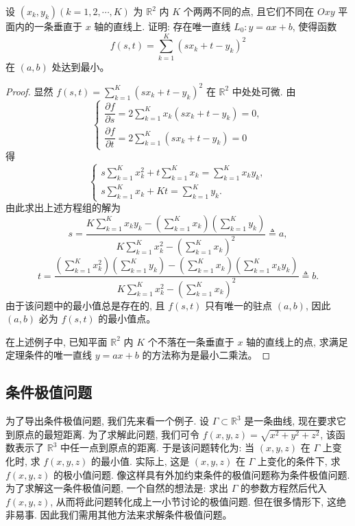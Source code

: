 \documentclass[UTF8,12pt,a4paper,fontset=fandol]{ctexart}
\begin{document}
\begin{example}\label{course-example-14-5-3}\quad 设 $(x_k,y_k)(k=1,2,\cdots,K)$ 为 $\mathbb R^2$ 内 $K$ 个两两不同的点, 且它们不同在 $Oxy$ 平面内的一条垂直于 $x$ 轴的直线上. 证明: 存在唯一直线 $L_0:y=ax+b$, 使得函数
\[
  f(s,t)=\sum_{k=1}^K(sx_k+t-y_k)^2
\]
在 $(a,b)$ 处达到最小。

\end{example}
\begin{proof}\quad 显然 $f(s,t)=\sum\limits_{k=1}^K(sx_k+t-y_k)^2$ 在 $\mathbb R^2$ 中处处可微. 由
\[
  \begin{cases}
    \dfrac{\partial f}{\partial s}
    =2\displaystyle\sum_{k=1}^K x_k(sx_k+t-y_k)=0,\\[1.2ex]
    \dfrac{\partial f}{\partial t}
    =2\displaystyle\sum_{k=1}^K (sx_k+t-y_k)=0
  \end{cases}
\]
得
\[
  \begin{cases}
    s\displaystyle\sum_{k=1}^K x_k^2
    +t\displaystyle\sum_{k=1}^K x_k
    =\displaystyle\sum_{k=1}^K x_ky_k,\\[1.2ex]
    s\displaystyle\sum_{k=1}^K x_k
    +Kt
    =\displaystyle\sum_{k=1}^K y_k.
  \end{cases}
\]
由此求出上述方程组的解为
\[
  s=
  \frac{
    K\displaystyle\sum_{k=1}^K x_ky_k
    -\left(\displaystyle\sum_{k=1}^K x_k\right)
     \left(\displaystyle\sum_{k=1}^K y_k\right)}
  {
    K\displaystyle\sum_{k=1}^K x_k^2
    -\left(\displaystyle\sum_{k=1}^K x_k\right)^2}
  \triangleq a,
\]
\[
  t=
  \frac{
    \left(\displaystyle\sum_{k=1}^K x_k^2\right)
    \left(\displaystyle\sum_{k=1}^K y_k\right)
    -\left(\displaystyle\sum_{k=1}^K x_k\right)
     \left(\displaystyle\sum_{k=1}^K x_ky_k\right)}
  {
    K\displaystyle\sum_{k=1}^K x_k^2
    -\left(\displaystyle\sum_{k=1}^K x_k\right)^2}
  \triangleq b.
\]
由于该问题中的最小值总是存在的, 且 $f(s,t)$ 只有唯一的驻点 $(a,b)$, 因此 $(a,b)$ 必为 $f(s,t)$ 的最小值点。

在上述例子中, 已知平面 $\mathbb R^2$ 内 $K$ 个不落在一条垂直于 $x$ 轴的直线上的点, 求满足定理条件的唯一直线 $y=ax+b$ 的方法称为是最小二乘法。

\end{proof}
\subsection{条件极值问题}

为了导出条件极值问题, 我们先来看一个例子. 设 $\Gamma\subset\mathbb R^3$ 是一条曲线, 现在要求它到原点的最短距离. 为了求解此问题, 我们可令 $f(x,y,z)=\sqrt{x^2+y^2+z^2}$, 该函数表示了 $\mathbb R^3$ 中任一点到原点的距离. 于是该问题转化为: 当 $(x,y,z)$ 在 $\Gamma$ 上变化时, 求 $f(x,y,z)$ 的最小值. 实际上, 这是 $(x,y,z)$ 在 $\Gamma$ 上变化的条件下, 求 $f(x,y,z)$ 的极小值问题. 像这样具有外加约束条件的极值问题称为条件极值问题. 为了求解这一条件极值问题, 一个自然的想法是: 求出 $\Gamma$ 的参数方程然后代入 $f(x,y,z)$, 从而将此问题转化成上一小节讨论的极值问题. 但在很多情形下, 这绝非易事. 因此我们需用其他方法来求解条件极值问题。
\end{document}
